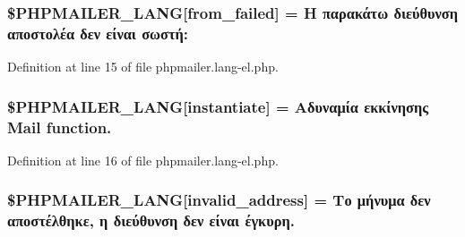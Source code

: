 \subsubsection[{\texorpdfstring{\$\+P\+H\+P\+M\+A\+I\+L\+E\+R\+\_\+\+L\+A\+NG}{$PHPMAILER_LANG}}]{\setlength{\rightskip}{0pt plus 5cm}\$P\+H\+P\+M\+A\+I\+L\+E\+R\+\_\+\+L\+A\+NG\mbox{[}\textquotesingle{}from\+\_\+failed\textquotesingle{}\mbox{]} = \textquotesingle{}Η παρακάτω διεύθυνση αποστολέα δεν είναι σωστή\+: \textquotesingle{}}\hypertarget{phpmailer_8lang-el_8php_adf832ae12155a09be077c6d5e4fd7e22}{}\label{phpmailer_8lang-el_8php_adf832ae12155a09be077c6d5e4fd7e22}


Definition at line 15 of file phpmailer.\+lang-\/el.\+php.

\subsubsection[{\texorpdfstring{\$\+P\+H\+P\+M\+A\+I\+L\+E\+R\+\_\+\+L\+A\+NG}{$PHPMAILER_LANG}}]{\setlength{\rightskip}{0pt plus 5cm}\$P\+H\+P\+M\+A\+I\+L\+E\+R\+\_\+\+L\+A\+NG\mbox{[}\textquotesingle{}instantiate\textquotesingle{}\mbox{]} = \textquotesingle{}Αδυναμία εκκίνησης Mail function.\textquotesingle{}}\hypertarget{phpmailer_8lang-el_8php_ad58dde16780f4770ccf4dd282ea1f5ad}{}\label{phpmailer_8lang-el_8php_ad58dde16780f4770ccf4dd282ea1f5ad}


Definition at line 16 of file phpmailer.\+lang-\/el.\+php.

\subsubsection[{\texorpdfstring{\$\+P\+H\+P\+M\+A\+I\+L\+E\+R\+\_\+\+L\+A\+NG}{$PHPMAILER_LANG}}]{\setlength{\rightskip}{0pt plus 5cm}\$P\+H\+P\+M\+A\+I\+L\+E\+R\+\_\+\+L\+A\+NG\mbox{[}\textquotesingle{}invalid\+\_\+address\textquotesingle{}\mbox{]} = \textquotesingle{}Το μήνυμα δεν αποστέλθηκε, η διεύθυνση δεν είναι έγκυρη.\textquotesingle{}}\hypertarget{phpmailer_8lang-el_8php_a42d61bcea4c79599ecb44fd062f54d47}{}\label{phpmailer_8lang-el_8php_a42d61bcea4c79599ecb44fd062f54d47}


